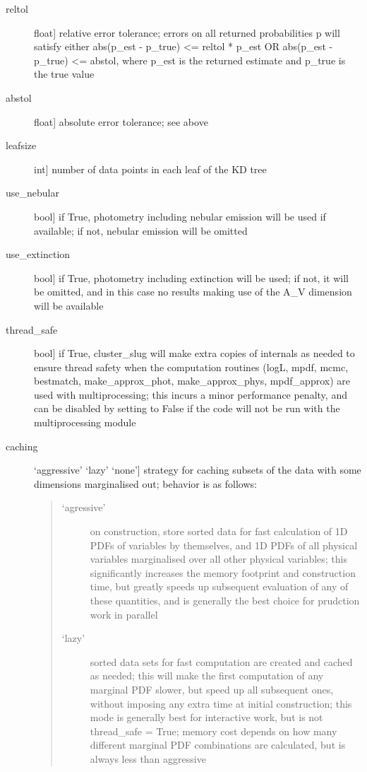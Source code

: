 \documentclass[letterpaper,10pt,english]{sphinxmanual}
\begin{document}
\begin{fulllineitems}
\begin{fulllineitems}
\begin{description}
\begin{description}
\item[{reltol}] \leavevmode{[}float{]}
relative error tolerance; errors on all returned
probabilities p will satisfy either
abs(p\_est - p\_true) \textless{}= reltol * p\_est   OR
abs(p\_est - p\_true) \textless{}= abstol,
where p\_est is the returned estimate and p\_true is the
true value

\item[{abstol}] \leavevmode{[}float{]}
absolute error tolerance; see above

\item[{leafsize}] \leavevmode{[}int{]}
number of data points in each leaf of the KD tree

\item[{use\_nebular}] \leavevmode{[}bool{]}
if True, photometry including nebular emission will be
used if available; if not, nebular emission will be
omitted

\item[{use\_extinction}] \leavevmode{[}bool{]}
if True, photometry including extinction will be used;
if not, it will be omitted, and in this case no results
making use of the A\_V dimension will be available

\item[{thread\_safe}] \leavevmode{[}bool{]}
if True, cluster\_slug will make extra copies of internals
as needed to ensure thread safety when the computation
routines (logL, mpdf, mcmc, bestmatch, make\_approx\_phot,
make\_approx\_phys, mpdf\_approx) are used with
multiprocessing; this incurs a minor performance
penalty, and can be disabled by setting to False if the
code will not be run with the multiprocessing module

\item[{caching}] \leavevmode{[}‘aggressive’ \textbar{} ‘lazy’ \textbar{} ‘none’{]}
strategy for caching subsets of the data with some
dimensions marginalised out; behavior is as follows:
\begin{quote}
\begin{description}
\item[{‘agressive’}] \leavevmode
on construction, store sorted data for fast
calculation of 1D PDFs of variables by themselves,
and 1D PDFs of all physical variables marginalised
over all other physical variables; this
significantly increases the memory footprint and
construction time, but greatly speeds up
subsequent evaluation of any of these quantities,
and is generally the best choice for prudction
work in parallel

\item[{‘lazy’}] \leavevmode
sorted data sets for fast computation are created
and cached as needed; this will make the first
computation of any marginal PDF slower, but speed
up all subsequent ones, without imposing any
extra time at initial construction; this mode is
generally best for interactive work, but is not
thread\_safe = True; memory cost depends on how
many different marginal PDF combinations are
calculated, but is always less than aggressive


\end{description}
\end{quote}
\end{description}
\end{description}
\end{fulllineitems}
\end{fulllineitems}
\end{document}
